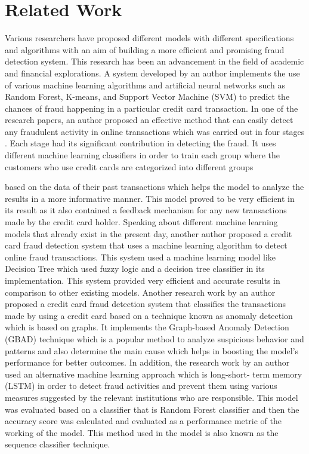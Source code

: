 \section{Related Work}

Various researchers have proposed different models with different specifications and algorithms
with an aim of building a more efficient and promising fraud detection system. This research has
been an advancement in the field of academic and financial explorations. A system developed
by an author \citep{Asha-2021}  implements the use of various machine learning algorithms and artificial neural
networks such as Random Forest, K-means, and Support Vector Machine (SVM) to predict the
chances of fraud happening in a particular credit card transaction. In one of the research
papers, an author proposed an effective method that can easily detect any fraudulent activity in
online transactions which was carried out in four stages \citep{Jiang-2018}. Each stage had its significant
contribution in detecting the fraud. It uses different machine learning classifiers in order to train
each group where the customers who use credit cards are categorized into different groups

based on the data of their past transactions which helps the model to analyze the results in a
more informative manner. This model proved to be very efficient in its result as it also contained
a feedback mechanism for any new transactions made by the credit card holder. Speaking
about different machine learning models that already exist in the present day, another author
proposed a credit card fraud detection system \citep{Askari-2017}  that uses a machine learning algorithm to
detect online fraud transactions. This system used a machine learning model like Decision Tree
which used fuzzy logic and a decision tree classifier in its implementation. This system provided
very efficient and accurate results in comparison to other existing models. Another research
work by an author proposed a credit card fraud detection system that classifies the transactions
made by using a credit card based on a technique known as anomaly detection \citep{Pourhabibi-2020} which is
based on graphs. It implements the Graph-based Anomaly Detection (GBAD) technique which
is a popular method to analyze suspicious behavior and patterns and also determine the main
cause which helps in boosting the model’s performance for better outcomes. In addition, the
research work by an author used an alternative machine learning approach which is long-short-
term memory (LSTM) \citep{Jurgovsky-2018}  in order to detect fraud activities and prevent them using various
measures suggested by the relevant institutions who are responsible. This model was evaluated
based on a classifier that is Random Forest classifier and then the accuracy score was
calculated and evaluated as a performance metric of the working of the model. This method
used in the model is also known as the sequence classifier technique.

